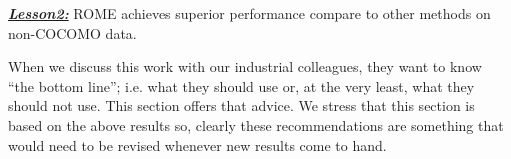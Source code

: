 \documentclass[sigconf,review,anonymous]{acmart}
\newenvironment{result}[2]
{\begin{myshadowbox}\textbf{\textit{\underline{Lesson#1:}}} #2}{ 
\end{myshadowbox}}
\begin{document}
 \begin{result}{2}
ROME achieves superior performance compare to other methods on non-COCOMO data.
 \end{result}




 


 

 When we discuss this work with our industrial colleagues, they want to know ``the bottom line''; i.e. what they should use or, at the very least, what they should not use. This section offers that advice. We stress that this  section is  based on the above results so, clearly these   recommendations are something that would need to be revised whenever new results come to hand.
\end{document}
